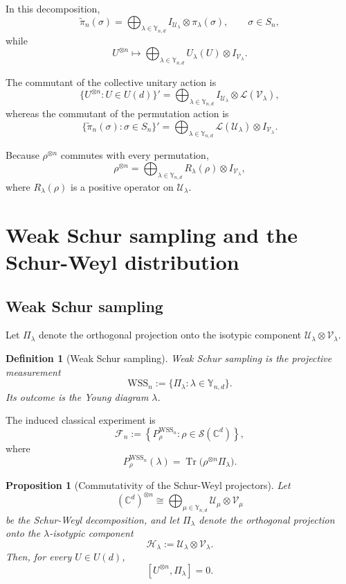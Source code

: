 \documentclass{article}
\newtheorem{prop}[theorem]{Proposition}
\newtheorem{definition}{Definition}
\theoremstyle{named}
\theoremstyle{named1}
\newcommand{\Tr}{\operatorname{Tr}}
\newcommand{\WSS}{\mathrm{WSS}}
\newcommand{\ot}{\otimes}
\newcommand{\cF}{\mathcal F}
\newcommand{\cU}{\mathcal U}
\newcommand{\cV}{\mathcal V}
\newcommand{\Young}{\mathbb Y_{n,d}}
\theoremstyle{plain}
\theoremstyle{remark}
\begin{document}
In this decomposition,
\[
\widetilde\pi_n(\sigma)
=
\bigoplus_{\lambda\in\Young}
I_{\cU_\lambda}\otimes\pi_\lambda(\sigma),
\qquad \sigma\in S_n,
\]
while
\[
    U^{\ot n}
    \longmapsto
    \bigoplus_{\lambda\in\Young}
     U_\lambda(U)\otimes I_{\cV_\lambda}. 
\]

The commutant of the collective unitary action is
\[
    \{U^{\ot n}:U\in U(d)\}'
    =
    \bigoplus_{\lambda\in\Young}
    I_{\cU_\lambda} \ot \mathcal L(\cV_\lambda),
\]
whereas the commutant of the permutation action is
\[
    \{\widetilde\pi_n(\sigma):\sigma\in S_n\}'
    =
    \bigoplus_{\lambda\in\Young}
    \mathcal L(\cU_\lambda) \ot I_{\cV_\lambda}.
\]

Because $\rho^{\otimes n}$ commutes with every permutation,
\[
\rho^{\otimes n}
=\bigoplus_{\lambda\in\mathbb Y_{n,d}}
R_\lambda(\rho)\otimes I_{\mathcal V_\lambda},
\]
where $R_\lambda(\rho)$ is a positive operator on
$\mathcal U_\lambda$.

\section{Weak Schur sampling and the Schur-Weyl distribution}

\subsection{Weak Schur sampling}
Let $\Pi_\lambda$ denote the orthogonal projection onto the
isotypic component $\mathcal U_\lambda\otimes\mathcal V_\lambda$.

\begin{definition}[Weak Schur sampling]
Weak Schur sampling is the projective measurement
\[
    \WSS_n:=\{\Pi_\lambda:\lambda\in\Young\}.
\]
Its outcome is the Young diagram $\lambda$.
\end{definition}

The induced classical experiment is
\[
    \cF_n
    :=
    \left\{
        P_\rho^{\WSS_n}:
        \rho\in\mathcal S(\mathbb C^d)
    \right\},
\]
where
\[
    P_\rho^{\WSS_n}(\lambda)
    =\Tr\bigl(\rho^{\ot n}\Pi_\lambda\bigr).
\]


\begin{prop}[Commutativity of the Schur-Weyl projectors]
Let
\[
(\mathbb C^d)^{\otimes n}
\cong
\bigoplus_{\mu\in\mathbb Y_{n,d}}
\mathcal U_\mu\otimes\mathcal V_\mu
\]
be the Schur-Weyl decomposition, and let \(\Pi_\lambda\) denote the
orthogonal projection onto the \(\lambda\)-isotypic component
\[
\mathcal H_\lambda
:=
\mathcal U_\lambda\otimes\mathcal V_\lambda.
\]
Then, for every \(U\in U(d)\),
\[
[U^{\otimes n},\Pi_\lambda]=0.
\]
\end{prop}
\end{document}
